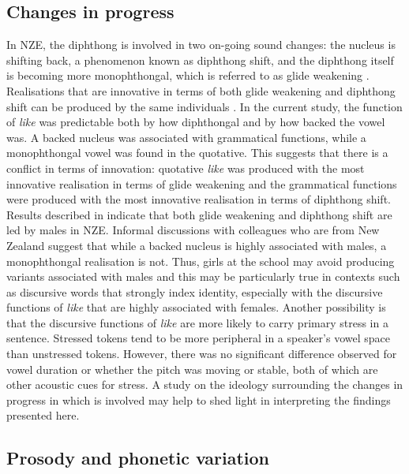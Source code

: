\subsection{Changes in progress}
In NZE, the diphthong  is involved in two on-going sound changes: the nucleus is shifting back, a phenomenon known as diphthong shift, \cite[149]{onzebook} and the diphthong itself is becoming more monophthongal, which is referred to as glide weakening \cite{onzebook,chartres2008}.  Realisations that are innovative in terms of both glide weakening and diphthong shift can be produced by the same individuals \cite{chartres2008}.  In the current study, the function of \textit{like} was predictable both by how diphthongal and by how backed the vowel was.  A backed nucleus was associated with grammatical functions, while a monophthongal vowel was found in the quotative.  This suggests that there is a conflict in terms of innovation: quotative \textit{like} was produced with the most innovative realisation in terms of glide weakening and the grammatical functions were produced with the most innovative realisation in terms of diphthong shift.  Results described in  indicate that both glide weakening and diphthong shift are led by males in NZE.  Informal discussions with colleagues who are from New Zealand suggest that while a backed nucleus is highly associated with males, a monophthongal realisation is not. Thus, girls at the school may avoid producing variants associated with males and this may be particularly true in contexts such as discursive words that strongly index identity, especially with the discursive functions of \textit{like} that are highly associated with females.  Another possibility is that the discursive functions of \textit{like} are more likely to carry primary stress in a sentence.  Stressed tokens tend to be more peripheral in a speaker's vowel space than unstressed tokens.  However, there was no significant difference observed for vowel duration or whether the pitch was moving or stable, both of which are other acoustic cues for stress.  A study on the ideology surrounding the changes in progress in which  is involved may help to shed light in interpreting the findings presented here.

\subsection{Prosody and phonetic variation}\label{sec:prosody}

